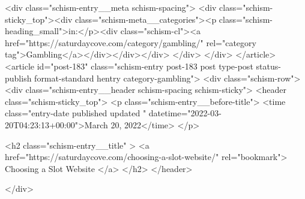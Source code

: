 {		<div class="schism-entry__meta schism-spacing">			<div class="schism-sticky_top"><div class="schism-meta__categories"><p class="schism-heading_small">in:</p><div class="schism-cl"><a href="https://saturdaycove.com/category/gambling/" rel="category tag">Gambling</a></div></div></div>		</div>
	</div>
</article>
<article id="post-183" class="schism-entry post-183 post type-post status-publish format-standard hentry category-gambling">
	<div class="schism-row">		<div class="schism-entry__header schism-spacing schism-sticky">			<header class="schism-sticky_top">				<p class="schism-entry__before-title">
					<time class="entry-date published updated " datetime="2022-03-20T04:23:13+00:00">March 20, 2022</time>				</p>

				<h2 class="schism-entry__title" >
					<a href="https://saturdaycove.com/choosing-a-slot-website/" rel="bookmark">
						Choosing a Slot Website					</a>
				</h2>
			</header>

					</div>

}
